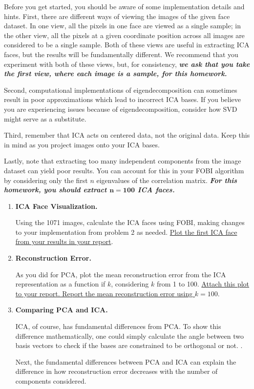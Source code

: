 Before you get started, you should be aware of some implementation details and hints.
First, there are different ways of viewing the images of the given face dataset. In one view, all the pixels in one face are viewed as a single sample; in the other view, all the pixels at a given coordinate position across all images are considered to be a single sample. Both of these views are useful in extracting ICA faces, but the results will be fundamentally different. We recommend that you experiment with both of these views, but, for consistency, \textit{\textbf{we ask that you take the first view, where each image is a sample, for this homework.}}

Second, computational implementations of eigendecomposition can sometimes result in poor approximations which lead to incorrect ICA bases. If you believe you are experiencing issues because of eigendecomposition, consider how SVD might serve as a substitute.

Third, remember that ICA acts on centered data, not the original data. Keep this in mind as you project images onto your ICA bases.

Lastly, note that extracting too many independent components from the image dataset can yield poor results. You can account for this in your FOBI algorithm by considering only the first $n$ eigenvalues of the correlation matrix. \textbf{\textit{For this homework, you should extract $\mathbf{n=100}$ ICA faces.}}

\begin{enumerate}
    \item \textbf{ICA Face Visualization.}
    
    Using the 1071 images, calculate the ICA faces using FOBI, making changes to your implementation from problem 2 as needed. \ul{Plot the first ICA face from your results in your report}.

    \item \textbf{Reconstruction Error.}
    
    As you did for PCA, plot the mean reconstruction error from the ICA representation as a function if $k$, considering $k$ from 1 to 100. \ul{Attach this plot to your report. Report the mean reconstruction error using $k=100$}.
    
    \item \textbf{Comparing PCA and ICA.}
    
    ICA, of course, has fundamental differences from PCA. To show this difference mathematically, one could simply calculate the angle between two basis vectors to check if the bases are constrained to be orthogonal or not. .
    
    Next, the fundamental differences between PCA and ICA can explain the difference in how reconstruction error decreases with the number of components considered. 
    
\end{enumerate}


